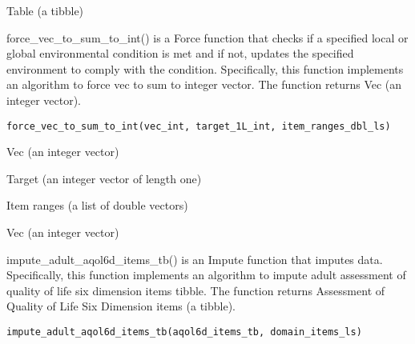 \documentclass[a4paper]{book}
\begin{document}
%
\begin{Value}
Table (a tibble)
\end{Value}
%
\begin{Description}\relax
force\_vec\_to\_sum\_to\_int() is a Force function that checks if a specified local or global environmental condition is met and if not, updates the specified environment to comply with the condition. Specifically, this function implements an algorithm to force vec to sum to integer vector. The function returns Vec (an integer vector).
\end{Description}
%
\begin{Usage}
\begin{verbatim}
force_vec_to_sum_to_int(vec_int, target_1L_int, item_ranges_dbl_ls)
\end{verbatim}
\end{Usage}
%
\begin{Arguments}
\begin{ldescription}
\item[\code{vec\_int}] Vec (an integer vector)

\item[\code{target\_1L\_int}] Target (an integer vector of length one)

\item[\code{item\_ranges\_dbl\_ls}] Item ranges (a list of double vectors)
\end{ldescription}
\end{Arguments}
%
\begin{Value}
Vec (an integer vector)
\end{Value}
%
\begin{Description}\relax
impute\_adult\_aqol6d\_items\_tb() is an Impute function that imputes data. Specifically, this function implements an algorithm to impute adult assessment of quality of life six dimension items tibble. The function returns Assessment of Quality of Life Six Dimension items (a tibble).
\end{Description}
%
\begin{Usage}
\begin{verbatim}
impute_adult_aqol6d_items_tb(aqol6d_items_tb, domain_items_ls)
\end{verbatim}
\end{Usage}
\end{document}

